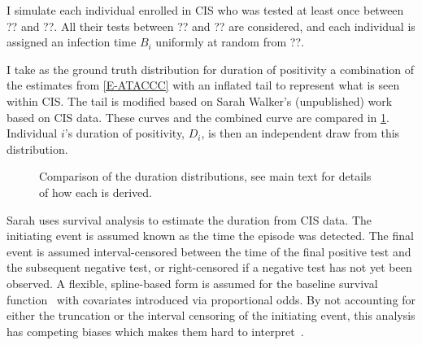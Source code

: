 \documentclass[thesis.tex]{subfiles}
\begin{document}
I simulate each individual enrolled in CIS who was tested at least once between ?? and ??.
All their tests between ?? and ?? are considered, and each individual is assigned an infection time $B_i$ uniformly at random from ??.

I take as the ground truth distribution for duration of positivity a combination of the estimates from \cref{E-ATACCC} with an inflated tail to represent what is seen within CIS.
The tail is modified based on Sarah Walker's (unpublished) work based on CIS data.
These curves and the combined curve are compared in \cref{perf-test:fig:duration-dist}.
Individual $i$'s duration of positivity, $D_i$, is then an independent draw from this distribution.

\begin{figure}
  \caption[Comparison of duration distributions]{Comparison of the duration distributions, see main text for details of how each is derived. \label{perf-test:fig:duration-dist}}
\end{figure}

Sarah uses survival analysis to estimate the duration from CIS data.
The initiating event is assumed known as the time the episode was detected.
The final event is assumed interval-censored between the time of the final positive test and the subsequent negative test, or right-censored if a negative test has not yet been observed.
A flexible, spline-based form is assumed for the baseline survival function~\autocite{roystonSTPM,roystonFlexible} with covariates introduced via proportional odds.
By not accounting for either the truncation or the interval censoring of the initiating event, this analysis has competing biases which makes them hard to interpret~\autocite{cisMethodsONS}.

\end{document}
